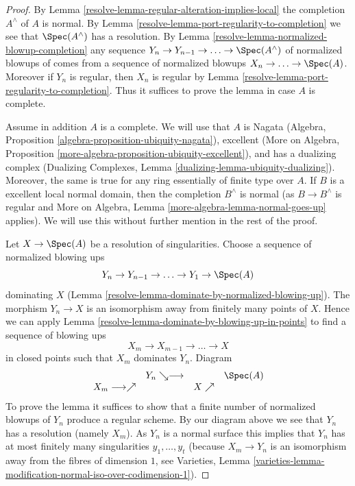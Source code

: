 \begin{proof}

By Lemma \ref{resolve-lemma-regular-alteration-implies-local}
the completion $A^\wedge$ of $A$ is normal.
By Lemma \ref{resolve-lemma-port-regularity-to-completion} we see
that $\Spec(A^\wedge)$ has a resolution.
By Lemma \ref{resolve-lemma-normalized-blowup-completion}
any sequence $Y_n \to Y_{n - 1} \to \ldots \to \Spec(A^\wedge)$
of normalized blowups of comes from a sequence of normalized
blowups $X_n \to \ldots \to \Spec(A)$. Moreover if $Y_n$ is
regular, then $X_n$ is regular by
Lemma \ref{resolve-lemma-port-regularity-to-completion}.
Thus it suffices to prove the lemma in case $A$ is complete.

\medskip\noindent
Assume in addition $A$ is a complete. We will use that $A$ is Nagata
(Algebra, Proposition \ref{algebra-proposition-ubiquity-nagata}),
excellent (More on Algebra, Proposition
\ref{more-algebra-proposition-ubiquity-excellent}),
and has a dualizing complex
(Dualizing Complexes, Lemma \ref{dualizing-lemma-ubiquity-dualizing}).
Moreover, the same is true for any ring essentially of finite type over $A$.
If $B$ is a excellent local normal domain, then the completion
$B^\wedge$ is normal (as $B \to B^\wedge$ is regular and
More on Algebra, Lemma \ref{more-algebra-lemma-normal-goes-up} applies).
We will use this without further mention in the rest of the proof.

\medskip\noindent
Let $X \to \Spec(A)$ be a resolution of singularities.
Choose a sequence of normalized blowing ups
$$
Y_n \to Y_{n - 1} \to \ldots \to Y_1 \to \Spec(A)
$$
dominating $X$ (Lemma \ref{resolve-lemma-dominate-by-normalized-blowing-up}).
The morphism $Y_n \to X$ is an isomorphism away from
finitely many points of $X$.
Hence we can apply Lemma \ref{resolve-lemma-dominate-by-blowing-up-in-points}
to find a sequence of blowing ups
$$
X_m \to X_{m - 1} \to \ldots \to X
$$
in closed points such that $X_m$ dominates $Y_n$. Diagram
$$
\begin{array}{cccc} & Y_n \searrow\longrightarrow &  & \Spec(A) \\ X_m \longrightarrow\nearrow &  & X \nearrow & \end{array}
$$
To prove the lemma it suffices to show that a finite number of normalized
blowups of $Y_n$ produce a regular scheme. By our diagram above we see that
$Y_n$ has a resolution (namely $X_m$). As $Y_n$ is a normal surface
this implies that $Y_n$ has at most finitely many singularities
$y_1, \ldots, y_t$ (because $X_m \to Y_n$ is an isomorphism away from
the fibres of dimension $1$, see Varieties, Lemma
\ref{varieties-lemma-modification-normal-iso-over-codimension-1}).


\end{proof}
